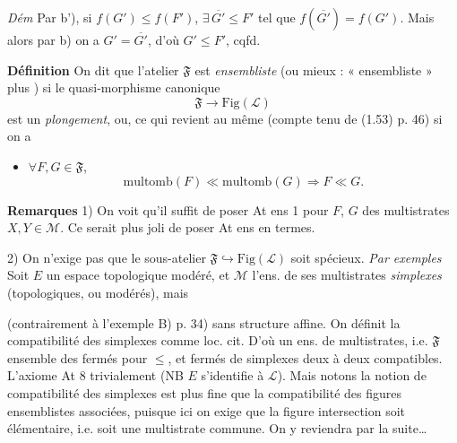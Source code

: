 \documentclass[11pt,a4paper]{article}
\begin{document}
\emph{Dém}  Par b'), \struck{\ill{}} si $f(G') \leq f(F')$, $\exists\, \overline{G'} \leq F'$ tel que $f(\overline{G'}) = f(G')$. Mais alors par b) on a $G' = \overline{G'}$, d'où $G' \leq F'$, cqfd.

\textbf{Définition} On dit que l'atelier $\mathfrak{F}$  est \struck{\ill{} \ill{}} \emph{ensembliste} (ou mieux : \ill{} « ensembliste » plus \ill{}) si le quasi-morphisme canonique
\[
  \mathfrak{F} \longrightarrow \mathrm{Fig}(\mathcal{L})
\]
est un \emph{plongement}, ou, ce qui revient au même (compte tenu de (1.53) p. 46) si on a
\begin{itemize}
  \item[\emph{At ens 1}] $\forall F, G \in \mathfrak{F}$,
  \[
    \mathrm{multomb}(F) \ll \mathrm{multomb}(G) \Longrightarrow F \ll G .
  \]
\end{itemize}


\textbf{Remarques} 1) On voit qu'il suffit de poser At ens 1 pour $F$, $G$ des multistrates  $X, Y \in \mathcal{M}$. Ce serait plus joli de poser At ens \ill{} \ill{} en termes.

2) On n'exige pas que le sous-atelier $\mathfrak{F} \hookrightarrow \mathrm{Fig}(\mathcal{L})$ soit spécieux. \emph{Par exemples}  \ill{} Soit $E$ un espace topologique \ill{} modéré, et $\mathcal{M}$ l'ens. de ses multistrates \emph{simplexes} (topologiques, ou modérés), mais

(contrairement à l'exemple B) p. 34) sans structure affine. On définit la compatibilité des simplexes comme loc. cit.  D'où un ens. de multistrates, i.e.  $\mathfrak{F}$ ensemble des   fermés pour $\leq$, et fermés de simplexes deux à deux compatibles. L'axiome At 8 trivialement \ill{} (NB $E$ s'identifie à $\mathcal{L}$). Mais notons \ill{} la notion de compatibilité des simplexes est plus fine que la compatibilité des figures ensemblistes associées, puisque ici on exige  que la figure intersection soit élémentaire, i.e. soit une multistrate commune. On y reviendra par la suite\ldots
\end{document}
